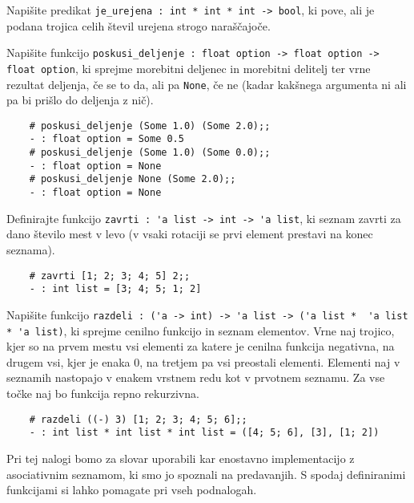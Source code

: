 \documentclass[arhiv]{../izpit}
\begin{document}
	
	

	\naloga 
  
	\podnaloga Napišite predikat \verb|je_urejena : int * int * int -> bool|, ki pove, ali je podana trojica celih števil urejena strogo naraščajoče.

  \podnaloga Napišite funkcijo \verb|poskusi_deljenje : float option -> float option -> float option|, ki sprejme morebitni deljenec in morebitni delitelj ter vrne rezultat deljenja, če se to da, ali pa \verb|None|, če ne (kadar kakšnega argumenta ni ali pa bi prišlo do deljenja z nič). 
  \begin{verbatim}
    # poskusi_deljenje (Some 1.0) (Some 2.0);;
    - : float option = Some 0.5
    # poskusi_deljenje (Some 1.0) (Some 0.0);;
    - : float option = None
    # poskusi_deljenje None (Some 2.0);;
    - : float option = None
  \end{verbatim}

  \podnaloga Definirajte funkcijo \verb|zavrti : 'a list -> int -> 'a list|, ki seznam zavrti za dano število mest v levo (v vsaki rotaciji se prvi element prestavi na konec seznama).
  \begin{verbatim}
    # zavrti [1; 2; 3; 4; 5] 2;;
    - : int list = [3; 4; 5; 1; 2]
  \end{verbatim}
	
  \podnaloga Napišite funkcijo \verb|razdeli : ('a -> int) -> 'a list -> ('a list *  'a list * 'a list)|, ki sprejme cenilno funkcijo in seznam elementov. Vrne naj trojico, kjer so na prvem mestu vsi elementi za katere je cenilna funkcija negativna, na drugem vsi, kjer je enaka 0, na tretjem pa vsi preostali elementi.
  Elementi naj v seznamih nastopajo v enakem vrstnem redu kot v prvotnem seznamu. Za vse točke naj bo funkcija repno rekurzivna.
  \begin{verbatim}
    # razdeli ((-) 3) [1; 2; 3; 4; 5; 6];;
    - : int list * int list * int list = ([4; 5; 6], [3], [1; 2])
  \end{verbatim}

  \naloga
  
  Pri tej nalogi bomo za slovar uporabili kar enostavno implementacijo z asociativnim seznamom, ki smo jo spoznali na predavanjih.
  S spodaj definiranimi funkcijami si lahko pomagate pri vseh podnalogah.
  
\end{document}

